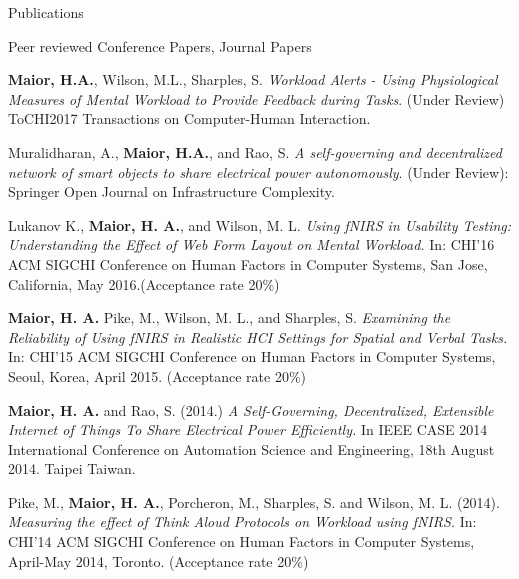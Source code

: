 \documentclass{resume} %
\begin{document}
	
	

	\begin{rSection}{Publications}
		\begin{rSubsection}{ }{ }{ }{Peer reviewed Conference Papers, Journal Papers}
			
			\item \textbf{Maior, H.A.}, Wilson, M.L., Sharples, S. \emph{Workload Alerts - Using Physiological Measures of Mental Workload to Provide Feedback during Tasks}. (Under Review) ToCHI2017 Transactions on Computer-Human Interaction.
			
			\item Muralidharan, A., \textbf{Maior, H.A.}, and Rao, S. \emph{A self-governing and decentralized network of smart objects to share electrical power autonomously}. (Under Review): Springer Open Journal on Infrastructure Complexity.
			
			\item Lukanov K., \textbf{Maior, H. A.}, and Wilson, M. L. \emph{Using fNIRS in Usability Testing: Understanding the Effect of Web Form Layout on Mental Workload.} In: CHI'16 ACM SIGCHI Conference on Human Factors in Computer Systems, San Jose, California, May 2016.(Acceptance rate 20\%)
			
			\item \textbf{Maior, H. A.} Pike, M., Wilson, M. L., and Sharples, S. \emph{Examining the Reliability of Using fNIRS in Realistic HCI Settings for Spatial and Verbal Tasks.} In: CHI'15 ACM SIGCHI Conference on Human Factors in Computer Systems, Seoul, Korea, April 2015. (Acceptance rate 20\%)
			
			\item \textbf{Maior, H. A.} and Rao, S. (2014.) \emph{A Self-Governing, Decentralized, Extensible Internet of Things To Share Electrical Power Efficiently.} In IEEE CASE 2014 International Conference on Automation Science and Engineering, 18th August 2014. Taipei Taiwan.
			
			\item Pike, M., \textbf{Maior, H. A.}, Porcheron, M., Sharples, S. and Wilson, M. L. (2014). \emph{Measuring the effect of Think Aloud Protocols on Workload using fNIRS.} In: CHI'14 ACM SIGCHI Conference on Human Factors in Computer Systems, April-May 2014, Toronto. (Acceptance rate 20\%)
			

\end{rSubsection}
\end{rSection}
\end{document}
